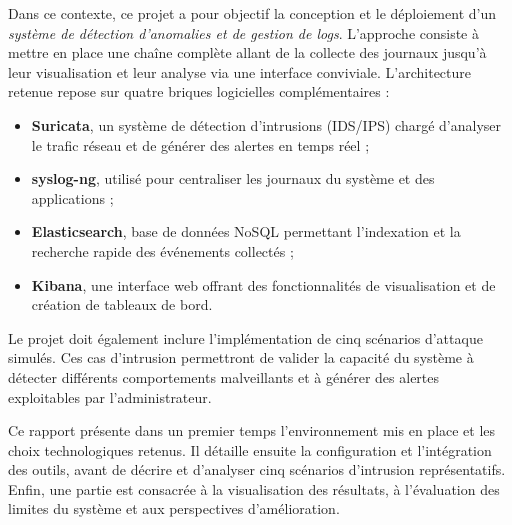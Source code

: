 \begin{introduction}

Dans ce contexte, ce projet a pour objectif la conception et le déploiement d’un
\textit{système de détection d’anomalies et de gestion de logs}. 
L’approche consiste à mettre en place une chaîne complète allant de la collecte des journaux
jusqu’à leur visualisation et leur analyse via une interface conviviale. 
L’architecture retenue repose sur quatre briques logicielles complémentaires :
\begin{itemize}
    \item \textbf{Suricata}, un système de détection d’intrusions (IDS/IPS) chargé
    d’analyser le trafic réseau et de générer des alertes en temps réel ;
    \item \textbf{syslog-ng}, utilisé pour centraliser les journaux du système et des applications ;
    \item \textbf{Elasticsearch}, base de données NoSQL permettant l’indexation et la recherche rapide
    des événements collectés ;
    \item \textbf{Kibana}, une interface web offrant des fonctionnalités de visualisation et de
    création de tableaux de bord.
\end{itemize}

Le projet doit également inclure l’implémentation de cinq scénarios d’attaque simulés. Ces cas d’intrusion permettront de valider la capacité du système à détecter
différents comportements malveillants et à générer des alertes exploitables par
l’administrateur.

Ce rapport présente dans un premier temps l’environnement mis en place et les choix
technologiques retenus. Il détaille ensuite la configuration et l’intégration des outils,
avant de décrire et d’analyser cinq scénarios d’intrusion représentatifs. 
Enfin, une partie est consacrée à la visualisation des résultats, à l’évaluation des limites
du système et aux perspectives d’amélioration.

\end{introduction}
